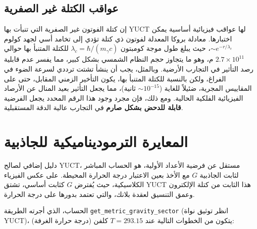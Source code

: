 \documentclass[11pt,a4paper]{article}
\begin{document}
	\subsection{عواقب الكتلة غير الصفرية}
	إن كتلة الفوتون غير الصفرية التي تنبأت بها YUCT لها عواقب فيزيائية أساسية يمكن اختبارها. معادلة بروكا المعدلة لفوتون ذي كتلة \cite{Proca1936} تؤدي إلى تخامد أسي لجهد كولوم $\sim e^{-r/\lambda_c}$، حيث يبلغ طول موجة كومبتون $\lambda_c = \hbar / (m_\gamma c)$ للكتلة المتنبأ بها حوالي $2.7 \times 10^{11}$ م، وهو ما يتجاوز حجم النظام الشمسي بشكل كبير، مما يفسر عدم قابلية رصد التأثير في التجارب الأرضية. وبالمثل، يجب أن ينشأ تشتت ترددي لسرعة الضوء في الفراغ، ولكن بالنسبة للكتلة المتنبأ بها، يكون التأخير الزمني المقابل، حتى على المقاييس المجرية، ضئيلاً للغاية ($\sim 10^{-15}$ ثانية)، مما يجعل التأثير بعيد المنال عن الأرصاد الفيزيائية الفلكية الحالية. ومع ذلك، فإن مجرد وجود هذا الرقم المحدد يجعل الفرضية \textbf{قابلة للدحض بشكل صارم} في التجارب عالية الدقة المستقبلية.
	
	\section{المعايرة الترموديناميكية للجاذبية}
	\label{sec:thermal_gravity}
	
	دليل إضافي لصالح YUCT، مستقل عن فرضية الأعداد الأولية، هو الحساب المباشر لثابت الجاذبية $G$ مع الأخذ بعين الاعتبار درجة الحرارة المحيطة. على عكس الفيزياء الكلاسيكية، حيث يُفترض $G$ كثابت أساسي، تشتق YUCT هذا الثابت من كتلة الإلكترون وعمق التنسيق لعقدة بلانك، والتي تعتمد بدورها على درجة الحرارة.
	
	الحساب، الذي أجرته الطريقة \texttt{get\_metric\_gravity\_sector} (انظر توثيق نواة YUCT)، يتكون من الخطوات التالية عند $T = 293.15$ كلفن (درجة حرارة الغرفة):
	
\end{document}
